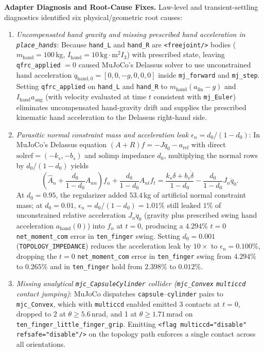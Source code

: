 \documentclass[11pt,a4paper]{article}
\begin{document}
\textbf{Adapter Diagnosis and Root-Cause Fixes.} Law-level and transient-settling diagnostics identified six physical/geometric root causes:
\begin{enumerate}[leftmargin=*,noitemsep]
\item \textit{Uncompensated hand gravity and missing prescribed hand acceleration in \texttt{place\_hands}}: Because \texttt{hand\_L} and \texttt{hand\_R} are \texttt{<freejoint/>} bodies ($m_{\mathrm{hand}} = 100$\,kg, $I_{\mathrm{hand}} = 10\,\mathrm{kg\cdot m^2} I_3$) with prescribed state, leaving \texttt{qfrc\_applied} $= 0$ caused MuJoCo's Delassus solver to use unconstrained hand acceleration $\ddot{q}_{\mathrm{hand},0} = [0, 0, -g, 0, 0, 0]$ inside \texttt{mj\_forward} and \texttt{mj\_step}. Setting \texttt{qfrc\_applied} on \texttt{hand\_L} and \texttt{hand\_R} to $m_{\mathrm{hand}}(a_{\mathrm{lin}} - g)$ and $I_{\mathrm{hand}} a_{\mathrm{ang}}$ (with velocity evaluated at time $t$ consistent with \texttt{mj\_Euler}) eliminates uncompensated hand-gravity drift and supplies the prescribed kinematic hand acceleration to the Delassus right-hand side.
\item \textit{Parasitic normal constraint mass and acceleration leak $\epsilon_n = d_0 / (1 - d_0)$}: In MuJoCo's Delassus equation $(A + R) f = -J \ddot{q}_0 - a_{\mathrm{ref}}$ with direct $\mathrm{solref} = (-k_s, -b_s)$ and $\mathrm{solimp}$ impedance $d_0$, multiplying the normal rows by $d_0 / (1 - d_0)$ yields
\begin{equation}
\left(\hat{A}_n + \frac{d_0}{1 - d_0} A_{nn}\right) f_n + \frac{d_0}{1 - d_0} A_{nt} f_t = \frac{k_s \delta + b_s \dot{\delta}}{1 - d_0} - \frac{d_0}{1 - d_0} J_n \ddot{q}_0.
\end{equation}
At $d_0 = 0.95$, the regularizer added $53.4$\,kg of artificial normal constraint mass; at $d_0 = 0.01$, $\epsilon_n = d_0/(1-d_0) = 1.01\%$ still leaked $1\%$ of unconstrained relative acceleration $J_n \ddot{q}_0$ (gravity plus prescribed swing hand acceleration $a_{\mathrm{hand}}(0)$) into $f_n$ at $t = 0$, producing a $4.294\%$ $t = 0$ \texttt{net\_moment\_com} error in \texttt{ten\_finger} swing. Setting $d_0 = 0.001$ (\texttt{TOPOLOGY\_IMPEDANCE}) reduces the acceleration leak by $10\times$ to $\epsilon_n = 0.100\%$, dropping the $t=0$ \texttt{net\_moment\_com} error in \texttt{ten\_finger} swing from $4.294\%$ to $0.265\%$ and in \texttt{ten\_finger} hold from $2.398\%$ to $0.012\%$.
\item \textit{Missing analytical \texttt{mjc\_CapsuleCylinder} collider (\texttt{mjc\_Convex} \texttt{multiccd} contact jumping)}: MuJoCo dispatches \texttt{capsule}--\texttt{cylinder} pairs to \texttt{mjc\_Convex}, which with \texttt{multiccd} enabled emitted 3 contacts at $t=0$, dropped to 2 at $\theta \ge 5.6$\,nrad, and 1 at $\theta \ge 1.71$\,mrad on \texttt{ten\_finger\_little\_finger\_grip}. Emitting \texttt{<flag multiccd="disable" refsafe="disable"/>} on the topology path enforces a single contact across all orientations.

\end{enumerate}
\end{document}
